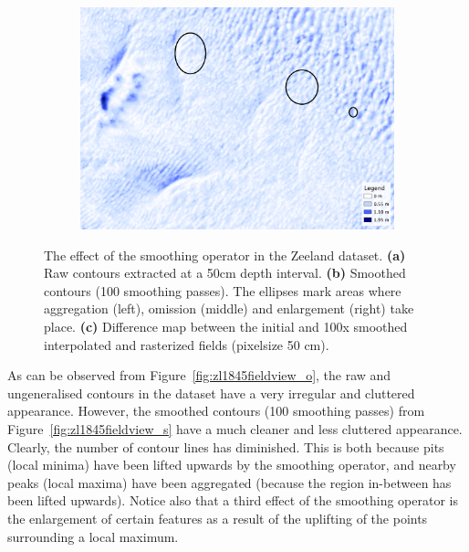 \begin{figure}
\begin{subfigure}[b]{0.55\linewidth}
    \centering
    \includegraphics[width=\textwidth]{figs/zl1845fieldview_raster_d.pdf}
    \caption{}\label{fig:zl1845fieldview_raster_d}
  \end{subfigure}
  \quad
  \caption{The effect of the smoothing operator in the Zeeland dataset. \textbf{(a)} Raw contours extracted at a 50cm depth interval. \textbf{(b)} Smoothed contours (100 smoothing passes). The ellipses mark areas where aggregation (left), omission (middle) and enlargement (right) take place. \textbf{(c)} Difference map between the initial and 100x smoothed interpolated and rasterized fields (pixelsize 50 cm).}
\label{fig:zl1845fieldview}
\end{figure}
As can be observed from Figure~\ref{fig:zl1845fieldview_o}, the raw and ungeneralised contours in the dataset have a very irregular and cluttered appearance. 
However, the smoothed contours (100 smoothing passes) from Figure~\ref{fig:zl1845fieldview_s} have a much cleaner and less cluttered appearance. 
Clearly, the number of contour lines has diminished. 
This is both because pits (local minima) have been lifted upwards by the smoothing operator, and nearby peaks (local maxima) have been aggregated (because the region in-between has been lifted upwards). 
Notice also that a third effect of the smoothing operator is the enlargement of certain features as a result of the uplifting of the points surrounding a local maximum. 

